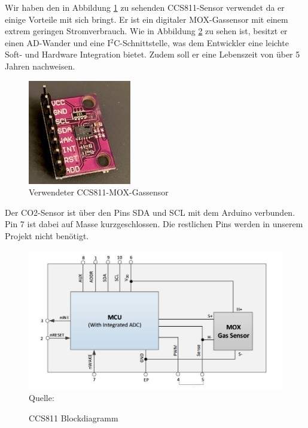 \label{CCS811}

Wir haben den in Abbildung \ref{fig:CCS811-Bild}  zu sehenden CCS811-Sensor verwendet da er einige Vorteile mit sich bringt. Er ist ein digitaler \ac{MOX}-Gassensor mit einem extrem geringen Stromverbrauch. Wie in Abbildung \ref{fig:ccs811Blockdiagramm} zu sehen ist, besitzt er einen \ac{AD}-Wander und eine I$^2$C-Schnittstelle, was dem Entwickler eine leichte Soft- und Hardware Integration bietet. Zudem soll er eine Lebenszeit von über 5 Jahren nachweisen. \cite[vgl. S. 1]{amsAG.2016} \\

\begin{figure}[!hbt]
	\centering
	\includegraphics[width=0.3\linewidth]{Images/CO2SensorCCS811}
	\caption{Verwendeter CCS811-\ac{MOX}-Gassensor}
	\label{fig:CCS811-Bild}
\end{figure}

Der CO2-Sensor ist über den Pins SDA und SCL mit dem Arduino verbunden. Pin 7 ist dabei auf Masse kurzgeschlossen. Die restlichen Pins werden in unserem Projekt nicht benötigt.

\begin{figure}[!hbt]
	\centering
	\includegraphics[width=0.9\linewidth]{Images/ccs811Blockdiagramm}
	\footnotesize{\\ Quelle: \cite[S. 3]{amsAG.2016}}
	\caption{CCS811 Blockdiagramm}
	\label{fig:ccs811Blockdiagramm}
\end{figure}

